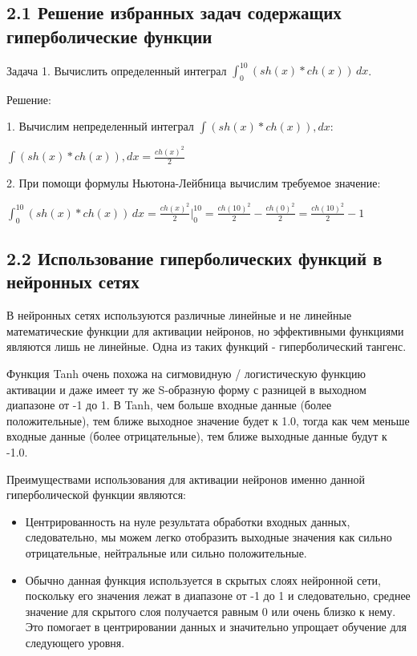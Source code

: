 \subsection*{2.1 Решение избранных задач содержащих гиперболические функции}
Задача 1. Вычислить определенный интеграл $\int_{0}^{10} (sh(x)*ch(x)) \,dx$.

Решение:

1. Вычислим непределенный интеграл $\int (sh(x)*ch(x)), dx$:\\
\begin{center}
    $\int (sh(x)*ch(x)), dx = \frac{ch(x)^2}{2}$
\end{center}

2. При помощи формулы Ньютона-Лейбница вычислим требуемое значение:\\
\begin{center}
    $\int_{0}^{10} (sh(x)*ch(x)) \,dx = \frac{ch(x)^2}{2}\vert_0^{10} = \frac{ch(10)^2}{2} - \frac{ch(0)^2}{2} = \frac{ch(10)^2}{2} - 1$
\end{center}
\subsection*{2.2 Использование гиперболических функций в нейронных сетях}

В нейронных сетях используются различные линейные и не линейные математические функции для активации нейронов, но эффективными функциями являются лишь не линейные. Одна из таких функций - гиперболический тангенс.

Функция Tanh очень похожа на сигмовидную / логистическую функцию активации и даже имеет ту же S-образную форму с разницей в выходном диапазоне от -1 до 1. В Tanh, чем больше входные данные (более положительные), тем ближе выходное значение будет к 1.0, тогда как чем меньше входные данные (более отрицательные), тем ближе выходные данные будут к -1.0.

Преимуществами использования для активации нейронов именно данной гиперболической функции являются:
\begin{itemize}
    \item Центрированность на нуле результата обработки входных данных, следовательно, мы можем легко отобразить выходные значения как сильно отрицательные, нейтральные или сильно положительные.
    \item Обычно данная функция используется в скрытых слоях нейронной сети, поскольку его значения лежат в диапазоне от -1 до 1 и следовательно, среднее значение для скрытого слоя получается равным 0 или очень близко к нему. Это помогает в центрировании данных и значительно упрощает обучение для следующего уровня.
\end{itemize}


